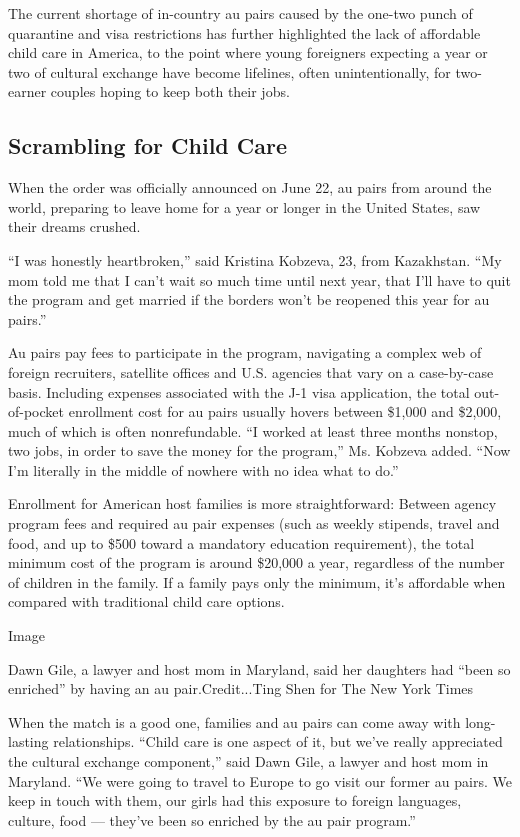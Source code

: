 The current shortage of in-country au pairs caused by the one-two punch
of quarantine and visa restrictions has further highlighted the lack of
affordable child care in America, to the point where young foreigners
expecting a year or two of cultural exchange have become lifelines,
often unintentionally, for two-earner couples hoping to keep both their
jobs.

\hypertarget{scrambling-for-child-care}{%
\subsection{Scrambling for Child Care}\label{scrambling-for-child-care}}

When the order was officially announced on June 22, au pairs from around
the world, preparing to leave home for a year or longer in the United
States, saw their dreams crushed.

``I was honestly heartbroken,'' said Kristina Kobzeva, 23, from
Kazakhstan. ``My mom told me that I can't wait so much time until next
year, that I'll have to quit the program and get married if the borders
won't be reopened this year for au pairs.''

Au pairs pay fees to participate in the program, navigating a complex
web of foreign recruiters, satellite offices and U.S. agencies that vary
on a case-by-case basis. Including expenses associated with the J-1 visa
application, the total out-of-pocket enrollment cost for au pairs
usually hovers between \$1,000 and \$2,000, much of which is often
nonrefundable. ``I worked at least three months nonstop, two jobs, in
order to save the money for the program,'' Ms. Kobzeva added. ``Now I'm
literally in the middle of nowhere with no idea what to do.''

Enrollment for American host families is more straightforward: Between
agency program fees and required au pair expenses (such as weekly
stipends, travel and food, and up to \$500 toward a mandatory education
requirement), the total minimum cost of the program is around \$20,000 a
year, regardless of the number of children in the family. If a family
pays only the minimum, it's affordable when compared with traditional
child care options.

Image

Dawn Gile, a lawyer and host mom in Maryland, said her daughters had
``been so enriched'' by having an au pair.Credit...Ting Shen for The New
York Times

When the match is a good one, families and au pairs can come away with
long-lasting relationships. ``Child care is one aspect of it, but we've
really appreciated the cultural exchange component,'' said Dawn Gile, a
lawyer and host mom in Maryland. ``We were going to travel to Europe to
go visit our former au pairs. We keep in touch with them, our girls had
this exposure to foreign languages, culture, food --- they've been so
enriched by the au pair program.''

